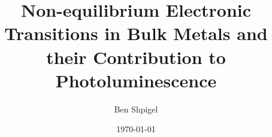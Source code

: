 \documentclass[11pt]{article}
\title{Non-equilibrium Electronic Transitions in Bulk Metals and their Contribution to Photoluminescence}
\author{Ben Shpigel}
\date{\today}
\numberwithin{equation}{section}
\begin{document}
\maketitle



\tableofcontents
\newpage






\appendix
\renewcommand{\thesection}{A\arabic{section}}
\setcounter{section}{0}









\nocite{*}


\end{document}
